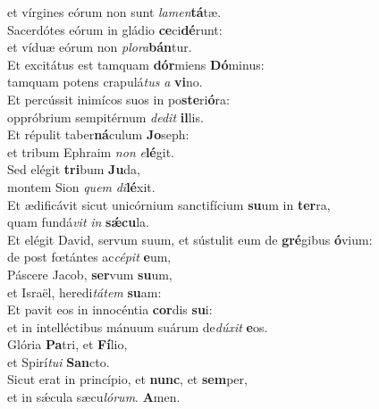 \oddverse et vírgines eórum non sunt \textit{la}\textit{men}\textbf{tá}tæ.\\
\evenverse Sacerdótes eórum in gládio \textbf{ce}ci\textbf{dé}runt:~\*\\
\evenverse et víduæ eórum non \textit{plo}\textit{ra}\textbf{bán}tur.\\
\oddverse Et excitátus est tamquam \textbf{dór}miens \textbf{Dó}minus:~\*\\
\oddverse tamquam potens crapulá\textit{tus} \textit{a} \textbf{vi}no.\\
\evenverse Et percússit inimícos suos in po\textbf{ste}ri\textbf{ó}ra:~\*\\
\evenverse oppróbrium sempitérnum \textit{de}\textit{dit} \textbf{il}lis.\\
\oddverse Et répulit taber\textbf{ná}culum \textbf{Jo}seph:~\*\\
\oddverse et tribum Ephraim \textit{non} \textit{e}\textbf{lé}git.\\
\evenverse Sed elégit \textbf{tri}bum \textbf{Ju}da,~\*\\
\evenverse montem Sion \textit{quem} \textit{di}\textbf{lé}xit.\\
\oddverse Et ædificávit sicut unicórnium sanctifícium \textbf{su}um in \textbf{ter}ra,~\*\\
\oddverse quam fundá\textit{vit} \textit{in} \textbf{sǽ}\textbf{cu}la.\\
\evenverse Et elégit David, servum suum, et sústulit eum de \textbf{gré}gibus \textbf{ó}vium:~\*\\
\evenverse de post fœtántes ac\textit{cé}\textit{pit} \textbf{e}um,\\
\oddverse Páscere Jacob, \textbf{ser}vum \textbf{su}um,~\*\\
\oddverse et Israël, heredi\textit{tá}\textit{tem} \textbf{su}am:\\
\evenverse Et pavit eos in innocéntia \textbf{cor}dis \textbf{su}i:~\*\\
\evenverse et in intelléctibus mánuum suárum de\textit{dú}\textit{xit} \textbf{e}os.\\
\oddverse Glória \textbf{Pa}tri, et \textbf{Fí}lio,~\*\\
\oddverse et Spirí\textit{tu}\textit{i} \textbf{San}cto.\\
\evenverse Sicut erat in princípio, et \textbf{nunc}, et \textbf{sem}per,~\*\\
\evenverse et in sǽcula sæcu\textit{ló}\textit{rum}. \textbf{A}men.\\
